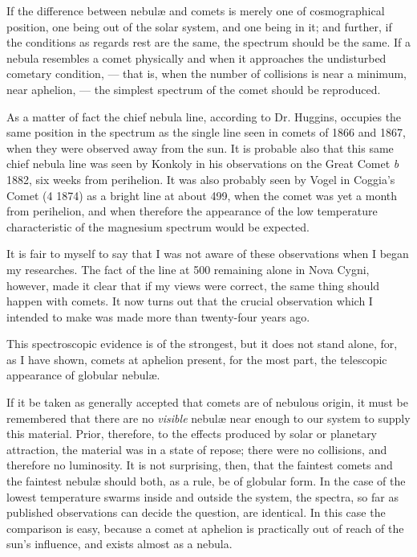 \documentclass[a4paper, 12pt, oneside, polutonikogreek, english]{article}
\begin{document}
If the difference between nebulæ and comets is merely one of cosmographical position, one being out of the solar system, and one being in it; and further, if the conditions as regards rest are the same, the spectrum should be the same. If a nebula resembles a comet physically and when it approaches the undisturbed cometary condition, --- that is, when the number of collisions is near a minimum, near aphelion, --- the simplest spectrum of the comet should be reproduced.

As a matter of fact the chief nebula line, according to Dr. Huggins, occupies the same position in the spectrum as the single line seen in comets of 1866 and 1867, when they were observed away from the sun. It is probable also that this same chief nebula line was seen by Konkoly in his observations on the Great Comet \emph{b} 1882, six weeks from perihelion. It was also probably seen by Vogel in Coggia's Comet (4 1874) as a bright line at about 499, when the comet was yet a month from perihelion, and when therefore the appearance of the low temperature characteristic of the magnesium spectrum would be expected.

It is fair to myself to say that I was not aware of these observations when I began my researches. The fact of the line at 500 remaining alone in Nova Cygni, however, made it clear that if my views were correct, the same thing should happen with comets. It now turns out that the crucial observation which I intended to make was made more than twenty-four years ago.

This spectroscopic evidence is of the strongest, but it does not stand alone, for, as I have shown, comets at aphelion present, for the most part, the telescopic appearance of globular nebulæ.

If it be taken as generally accepted that comets are of nebulous origin, it must be remembered that there are no \emph{visible} nebulæ near enough to our system to supply this material. Prior, therefore, to the effects produced by solar or planetary attraction, the material was in a state of repose; there were no collisions, and therefore no luminosity. It is not surprising, then, that the faintest comets and the faintest nebulæ should both, as a rule, be of globular form. In the case of the lowest temperature swarms inside and outside the system, the spectra, so far as published observations can decide the question, are identical. In this case the comparison is easy, because a comet at aphelion is practically out of reach of the sun's influence, and exists almost as a nebula.
\end{document}
